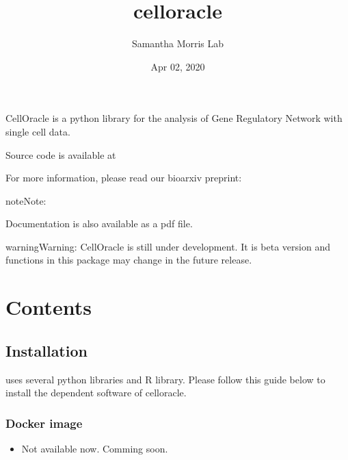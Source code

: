 \documentclass[letterpaper,10pt,english]{sphinxmanual}
\title{celloracle}
\date{Apr 02, 2020}
\author{Samantha Morris Lab}
\begin{document}
\pagestyle{empty}
\sphinxmaketitle
\pagestyle{plain}
\sphinxtableofcontents
\pagestyle{normal}
\label{\detokenize{index::doc}}


CellOracle is a python library for the analysis of Gene Regulatory Network with single cell data.

Source code is available at 

For more information, please read our bioarxiv preprint: 

\begin{sphinxadmonition}{note}{Note:}
\begin{DUlineblock}{0em}
\item[] Documentation is also available as a pdf file.
\end{DUlineblock}

\end{sphinxadmonition}

\begin{sphinxadmonition}{warning}{Warning:}
CellOracle is still under development. It is beta version and functions in this package may change in the future release.
\end{sphinxadmonition}


\chapter{Contents}
\label{\detokenize{index:contents}}

\section{Installation}
\label{\detokenize{installation/index:installation}}\label{\detokenize{installation/index:install}}\label{\detokenize{installation/index::doc}}
 uses several python libraries and R library. Please follow this guide below to install the dependent software of celloracle.


\subsection{Docker image}
\label{\detokenize{installation/index:docker-image}}\label{\detokenize{installation/index:require}}\begin{itemize}
\item {} 
Not available now. Comming soon.

\end{itemize}
\end{document}
